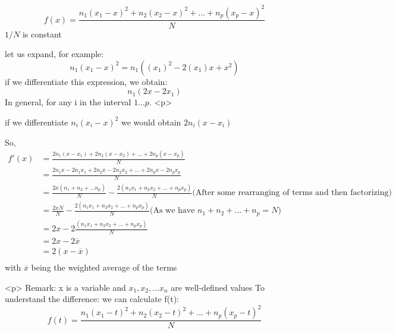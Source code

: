 $$
f(x)=\frac{n_1(x_1-x)^2 +n_2(x_2-x)^2 + ... + n_p (x_p - x)^2}{N}
$$
$1/N$ is constant

let us expand, for example:
$$
n_1(x_1 - x)^2
=n_1((x_1)^2 - 2(x_1)x + x^2)
$$
if we differentiate this expression, we obtain:
$$
n_1(2x - 2x_1)
$$
In general, for any i in the interval $1...p$.
<p>

if we differentiate $n_i(x_i - x)^2$ we would obtain  $2n_i(x - x_i)$

So, 
$$\begin{aligned}
f'(x) &= \frac{2n_1(x-x_1) + 2n_2(x-x_2) + ... + 2n_p(x-x_p)}{N}\\
&= \frac{2n_1x-2n_1x_1 + 2n_2x-2n_2x_2 + ... + 2n_px-2n_px_p}{N}\\
&= \frac{2x(n_1+n_2+...n_p)}{N} -\frac{2(n_1 x_1+n_2 x_2+...+n_p x_p)}{N}\text{(After some rearranging of terms and then factorizing)}\\
 &= \frac{2xN}{N} -\frac{2(n_1 x_1+n_2 x_2+...+n_p x_p)}{N} \text{(As we have $n_1 + n_2 + ... + n_p = N$)}\\
 &= 2x - 2\frac{(n_1 x_1+n_2 x_2+...+n_p x_p)}{N}\\
 &= 2x - 2\overline{x} \\
 &= 2(x - \overline{x})\\
\end{aligned}
$$
with $\overline{x}$ being the weighted average of the terms

<p>
Remark:
x is a variable and $x_1, x_2, ... x_n$ are well-defined values
To understand the difference:
we can calculate f(t):
$$
f(t)=\frac{n_1(x_1-t)^2 +n_2(x_2-t)^2 + ... + n_p (x_p - t)^2}{N}
$$

